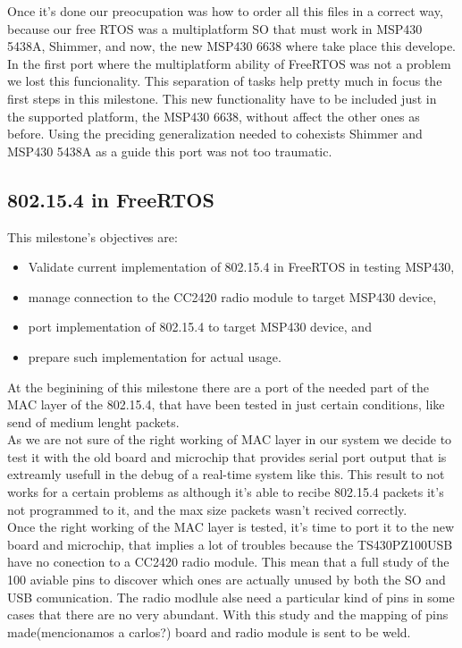 		Once it's done our preocupation was how to order all this files in a correct way, because our free RTOS was a multiplatform SO that must work in MSP430 5438A, Shimmer, and now, the new MSP430 6638 where take place this develope. In the first port where the multiplatform ability of FreeRTOS was not a problem we lost this funcionality. This separation of tasks help pretty much in focus the first steps in this milestone. This new functionality have to be included just in the supported platform, the MSP430 6638, without affect the other ones as before. Using the preciding generalization needed to cohexists Shimmer and MSP430 5438A as a guide this port was not too traumatic.

		\subsection{802.15.4 in FreeRTOS}
		This milestone's objectives are:
		\begin{itemize}
		\item Validate current implementation of 802.15.4 in FreeRTOS in testing MSP430,
		\item manage connection to the CC2420 radio module to target MSP430 device,
		\item port implementation of 802.15.4 to target MSP430 device, and
		\item prepare such implementation for actual usage.
		\end{itemize}
		At the beginining of this milestone there are a port of the needed part of the MAC layer of the 802.15.4, that have been tested in just certain conditions, like send of medium lenght packets.\\

		As we are not sure of the right working of MAC layer in our system we decide to test it with the old board and microchip that provides serial port output that is extreamly usefull in the debug of a real-time system like this. This result to not works for a certain problems as although it's able to recibe 802.15.4 packets it's not programmed to it, and the max size packets wasn't recived correctly.\\

		Once the right working of the MAC layer is tested, it's time to port it to the new board and microchip, that implies a lot of troubles because the TS430PZ100USB have no conection to a CC2420 radio module. This mean that a full study of the 100 aviable pins to discover which ones are actually unused by both the SO and USB comunication. The radio modlule alse need a particular kind of pins in some cases that there are no very abundant. With this study and the mapping of pins made(mencionamos a carlos?) board and radio module is sent to be weld.\\

